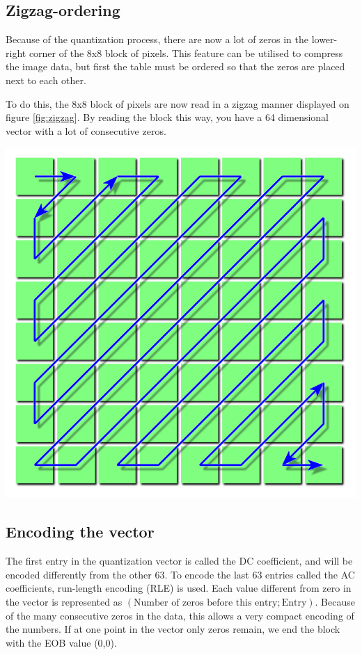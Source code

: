\begin{infobox}
\subsection{Zigzag-ordering} 
\vspace{-2.5mm}
Because of the quantization process, there are now a lot of zeros in the lower-right corner of the 8x8 block of pixels.
This feature can be utilised to compress the image data, but first the table must be ordered so that the zeros are placed next to each other. 

To do this, the 8x8 block of pixels are now read in a zigzag manner displayed on figure \ref{fig:zigzag}.
By reading the block this way, you have a 64 dimensional vector with a lot of consecutive zeros. 

\begin{centering}
\includegraphics[width=.5\textwidth]{figures/zigzagordering.png}
\label{fig:zigzag}
\end{centering} 

\vspace{4mm}
\subsection{Encoding the vector}
\vspace{-2.5mm}
The first entry in the quantization vector is called the DC coefficient, and will be encoded differently from the other 63. To encode the last 63 entries called the AC coefficients, run-length encoding (RLE) is used. Each value different from zero in the vector is represented as $(\text{Number of zeros before this entry}; \text{Entry})$. Because of the many consecutive zeros in the data, this allows a very compact encoding of the numbers. If at one point in the vector only zeros remain, we end the block with the EOB value (0,0). 


\end{infobox}

